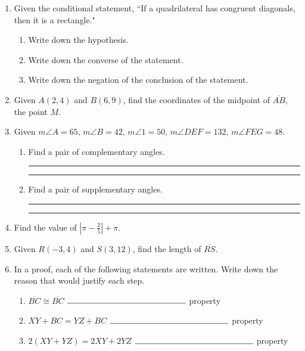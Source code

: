 \documentclass[12pt, oneside]{article}
\begin{document}
\begin{enumerate}
  \item Given the conditional statement, ``If a quadrilateral has congruent diagonals, then it is a rectangle."
    \begin{enumerate}
      \item Write down the hypothesis. \vspace{1.5cm}
      \item Write down the converse of the statement. \vspace{1.5cm}
      \item Write down the negation of the conclusion of the statement. \vspace{1.5cm}
    \end{enumerate}

  \item Given $A(2,4)$ and $B(6,9)$, find the coordinates of the midpoint of $\overline{AB}$, the point $M$.
    \vspace{5cm}

  \item Given $m \angle A=65$, $m \angle B=42$, $m \angle 1=50$, $m \angle DEF=132$, $m \angle FEG=48$. \bigskip
    \begin{enumerate}
      \item Find a pair of complementary angles. \rule{3cm}{0.15mm} \hspace{1cm} \rule{3cm}{0.15mm} \bigskip
      \item Find a pair of supplementary angles. \rule{3cm}{0.15mm} \hspace{1cm} \rule{3cm}{0.15mm} \bigskip
    \end{enumerate}

    \item Find the value of $|\pi-\frac{2}{5}|+\pi$. \vspace{2cm}

\newpage
  \item Given $R(-3,4)$ and $S(3,12)$, find the length of $\overline{RS}$.
      \vspace{4cm}

  \item In a proof, each of the following statements are written. Write down the reason that would justify each step. \bigskip
    \begin{enumerate}
      \item $\overline{BC} \cong \overline{BC}$ \hspace{4cm} $\rule{5cm}{0.15mm}$ property \bigskip
      \item $XY + BC= YZ+BC$  \hspace{1.7cm} $\rule{5cm}{0.15mm}$ property \bigskip
      \item $2(XY + YZ)=2XY+2YZ$  \hspace{0.8cm} $\rule{5cm}{0.15mm}$ property
    \end{enumerate} \bigskip


\end{enumerate}
\end{document}
